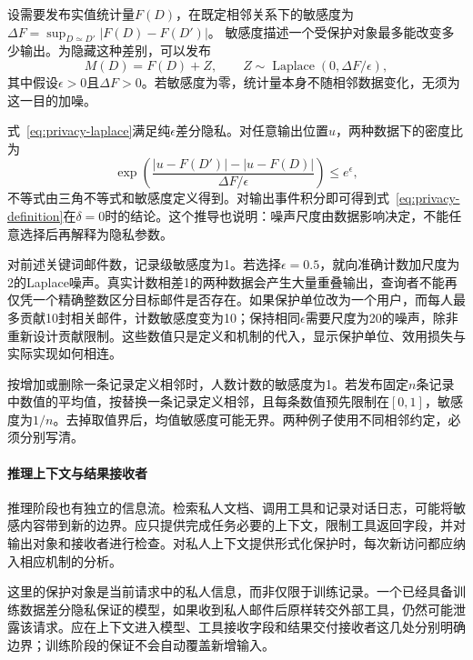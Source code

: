 设需要发布实值统计量$F(D)$，在既定相邻关系下的敏感度为
$\Delta F=\sup_{D\simeq D'}|F(D)-F(D')|$。
敏感度描述一个受保护对象最多能改变多少输出。为隐藏这种差别，可以发布
\begin{equation}
 M(D)=F(D)+Z,\qquad
 Z\sim\operatorname{Laplace}(0,\Delta F/\epsilon),
 \label{eq:privacy-laplace}
\end{equation}
其中假设$\epsilon>0$且$\Delta F>0$。若敏感度为零，统计量本身不随相邻数据变化，无须为这一目的加噪。

式~\eqref{eq:privacy-laplace}满足纯$\epsilon$差分隐私。对任意输出位置$u$，两种数据下的密度比为
\[
 \exp\left(
 \frac{|u-F(D')|-|u-F(D)|}{\Delta F/\epsilon}
 \right)\leq e^\epsilon,
\]
不等式由三角不等式和敏感度定义得到。对输出事件积分即可得到式~\eqref{eq:privacy-definition}在$\delta=0$时的结论。这个推导也说明：噪声尺度由数据影响决定，不能任意选择后再解释为隐私参数。

对前述关键词邮件数，记录级敏感度为1。若选择$\epsilon=0.5$，就向准确计数加尺度为2的Laplace噪声。真实计数相差1的两种数据会产生大量重叠输出，查询者不能再仅凭一个精确整数区分目标邮件是否存在。如果保护单位改为一个用户，而每人最多贡献10封相关邮件，计数敏感度变为10；保持相同$\epsilon$需要尺度为20的噪声，除非重新设计贡献限制。这些数值只是定义和机制的代入，显示保护单位、效用损失与实际实现如何相连。

\begin{example}[计数与平均值的不同要求]
\label{ex:privacy-sensitivity}
按增加或删除一条记录定义相邻时，人数计数的敏感度为1。若发布固定$n$条记录中数值的平均值，按替换一条记录定义相邻，且每条数值预先限制在$[0,1]$，敏感度为$1/n$。去掉取值界后，均值敏感度可能无界。两种例子使用不同相邻约定，必须分别写清。
\end{example}

\paragraph{推理上下文与结果接收者}

推理阶段也有独立的信息流。检索私人文档、调用工具和记录对话日志，可能将敏感内容带到新的边界。应只提供完成任务必要的上下文，限制工具返回字段，并对输出对象和接收者进行检查。对私人上下文提供形式化保护时，每次新访问都应纳入相应机制的分析。

这里的保护对象是当前请求中的私人信息，而非仅限于训练记录。一个已经具备训练数据差分隐私保证的模型，如果收到私人邮件后原样转交外部工具，仍然可能泄露该请求。应在上下文进入模型、工具接收字段和结果交付接收者这几处分别明确边界；训练阶段的保证不会自动覆盖新增输入。

